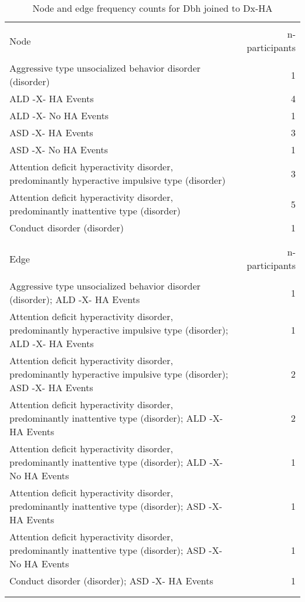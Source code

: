 \documentclass[10pt, letterpaper]{article}
\begin{document}
\begin{spacing}{1.0}
\begin{small}
    \begin{longtable}[H]{p{5in}r}
        \caption{Node and edge frequency counts for Dbh joined to Dx-HA}\\
        \hline\\[-8pt]
        Node & n-participants\\
        \hline\\[-6pt]
        Aggressive type unsocialized behavior disorder (disorder) & 1 \\
        \rowcolor{ltBlue}
        ALD -X- HA Events & 4 \\
        ALD -X- No HA Events & 1 \\
        \rowcolor{ltBlue}
        ASD -X- HA Events & 3 \\
        ASD -X- No HA Events & 1 \\
        \rowcolor{ltBlue}
        Attention deficit hyperactivity disorder, predominantly hyperactive impulsive type (disorder) & 3 \\
        Attention deficit hyperactivity disorder, predominantly inattentive type (disorder) & 5 \\
        \rowcolor{ltBlue}
        Conduct disorder (disorder) & 1 \\
        &\\[-6pt]
        \hline\\[-8pt]
        Edge & n-participants\\
        \hline\\[-6pt]
        Aggressive type unsocialized behavior disorder (disorder); ALD -X- HA Events & 1 \\
        \rowcolor{ltBlue}
        Attention deficit hyperactivity disorder, predominantly hyperactive impulsive type (disorder); ALD -X- HA Events & 1 \\
        Attention deficit hyperactivity disorder, predominantly hyperactive impulsive type (disorder); ASD -X- HA Events & 2 \\
        \rowcolor{ltBlue}
        Attention deficit hyperactivity disorder, predominantly inattentive type (disorder); ALD -X- HA Events & 2 \\
        Attention deficit hyperactivity disorder, predominantly inattentive type (disorder); ALD -X- No HA Events & 1 \\
        \rowcolor{ltBlue}
        Attention deficit hyperactivity disorder, predominantly inattentive type (disorder); ASD -X- HA Events & 1 \\
        Attention deficit hyperactivity disorder, predominantly inattentive type (disorder); ASD -X- No HA Events & 1 \\
        \rowcolor{ltBlue}
        Conduct disorder (disorder); ASD -X- HA Events & 1 \\
        & \\[-6pt]
        \hline
        \label{tab:Dbh-Dx-HA-01}
    \end{longtable}
\end{small}


\end{spacing}
\end{document}
